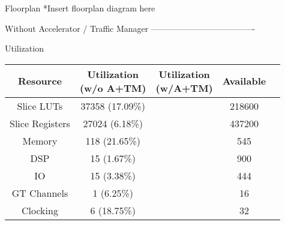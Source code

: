 \begin{block}{Floorplan}
*Insert floorplan diagram here



Without Accelerator / Traffic Manager
-------------------------------------


Utilization

\begin{center}
\begin{tabular}{ | c | c | c | c | c |} \hline
    Resource        & \pbox{20cm}{Utilization \\ (w/o A+TM)} & \pbox{20cm}{Utilization \\ (w/A+TM)} & Available \\ \hline
Slice LUTs      & 37358 (17.09\%)        &                & 218600    \\  \hline
Slice Registers & 27024 (6.18\%)         &                & 437200    \\  \hline
Memory          & 118   (21.65\%)        &                & 545       \\  \hline
DSP             & 15    (1.67\%)         &                & 900       \\  \hline
IO              & 15    (3.38\%)         &                & 444       \\  \hline
GT Channels     & 1     (6.25\%)         &                & 16        \\  \hline
Clocking        & 6     (18.75\%)        &                & 32        \\  \hline

\end{tabular}
\end{center}




\end{block}
